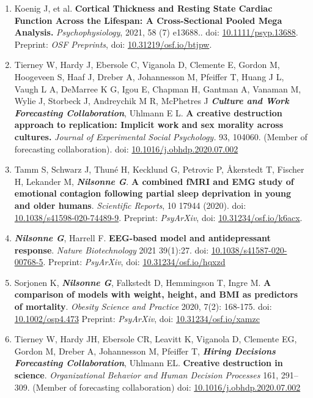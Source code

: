 \documentclass[10pt]{article}
\begin{document}
\begin{enumerate}[nolistsep]
 \href{https://doi.org/10.1101/843193}{10.1101/843193}.
\item Koenig J, et al. \textbf{Cortical Thickness and Resting State Cardiac Function Across the Lifespan: A Cross-Sectional Pooled Mega Analysis.} \emph{Psychophysiology}, 2021, 58 (7) e13688.. doi: \href{https://doi.org/10.1111/psyp.13688}{10.1111/psyp.13688}. Preprint: \emph{OSF Preprints}, 
doi: \href{https://doi.org/10.31219/osf.io/btjpw}{10.31219/osf.io/btjpw}.
\item Tierney W, Hardy J, Ebersole C, Viganola D, Clemente E, Gordon M, Hoogeveen S, Haaf J, Dreber A, Johannesson M, Pfeiffer T, Huang J L, Vaugh L A, DeMarree K G, Igou E, Chapman H, Gantman A, Vanaman M, Wylie J, Storbeck J, Andreychik M R, McPhetres J \textbf{\textit{Culture and Work Forecasting Collaboration}}, Uhlmann E L. \textbf{A creative destruction approach to replication: Implicit work and sex morality across cultures.} \emph{Journal of Experimental Social Psychology.} 93, 104060. (Member of forecasting collaboration). doi:  \href{https://doi.org/10.1016/j.obhdp.2020.07.002}{10.1016/j.obhdp.2020.07.002}
\item Tamm S, Schwarz J, Thuné H, Kecklund G, Petrovic P, Åkerstedt T, Fischer H, Lekander M, \textbf{\textit{Nilsonne G}}. \textbf{A combined fMRI and EMG study of emotional contagion following partial sleep deprivation in young and older humans}. \emph{Scientific Reports}, 10 17944 (2020). doi: \href{https://doi.org/10.1038/s41598-020-74489-9}{10.1038/s41598-020-74489-9}. Preprint: \emph{PsyArXiv}, doi: \href{https://doi.org/10.31234/osf.io/k6acx}{10.31234/osf.io/k6acx}.
\item \textbf{\textit{Nilsonne G}},  Harrell F. \textbf{EEG-based model and antidepressant response}. \emph{Nature Biotechnology} 2021 39(1):27. doi: \href{https://doi.org/10.1038/s41587-020-00768-5}{10.1038/s41587-020-00768-5}. Preprint: \emph{PsyArXiv}, doi: \href{https://doi.org/10.31234/osf.io/hqxzd}{10.31234/osf.io/hqxzd}
\item Sorjonen K, \textbf{\textit{Nilsonne G}}, Falkstedt D, Hemmingson T, Ingre M. \textbf{A comparison of models with weight, height, and BMI as predictors of mortality}. \emph{Obesity Science and Practice} 2020, 7(2): 168-175. doi: \href{https://doi.org/10.1002/osp4.473}{10.1002/osp4.473} Preprint: \emph{PsyArXiv}, doi: \href{https://doi.org/10.31234/osf.io/xamzc}{10.31234/osf.io/xamzc}
\item Tierney W, Hardy JH, Ebersole CR, Leavitt K, Viganola D, Clemente EG, Gordon M, Dreber A, Johannesson M, Pfeiffer T, \textbf{\textit{Hiring Decisions Forecasting Collaboration}}, Uhlmann EL. \textbf{Creative destruction in science}. \emph{Organizational Behavior and Human Decision Processes} 161, 291–309. (Member of forecasting collaboration) doi:  \href{https://doi.org/10.1016/j.obhdp.2020.07.002}{10.1016/j.obhdp.2020.07.002}

\end{enumerate}
\end{document}
